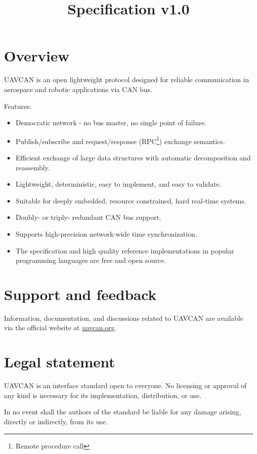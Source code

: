 \documentclass{uavcandoc}
\title{Specification v1.0}
\begin{document}
\frontmatter

\begin{titlepage}

\section*{Overview}

UAVCAN is an open lightweight protocol designed for reliable communication in aerospace and robotic applications via CAN bus.

Features:

\begin{itemize}
    \item Democratic network - no bus master, no single point of failure.
    \item Publish/subscribe and request/response (RPC\footnote{Remote procedure call}) exchange semantics.
    \item Efficient exchange of large data structures with automatic decomposition and reassembly.
    \item Lightweight, deterministic, easy to implement, and easy to validate.
    \item Suitable for deeply embedded, resource constrained, hard real-time systems.
    \item Doubly- or triply- redundant CAN bus support.
    \item Supports high-precision network-wide time synchronization.
    \item The specification and high quality reference implementations in popular programming languages are free and
    open source.
\end{itemize}

\BeginRightColumn

\section*{Support and feedback}

Information, documentation, and discussions related to UAVCAN are available via the official website at
\href{http://uavcan.org}{uavcan.org}.

\section*{Legal statement}

UAVCAN is an interface standard open to everyone.
No licensing or approval of any kind is necessary for its implementation, distribution, or use.

In no event shall the authors of the standard be liable for any damage arising, directly or indirectly, from its use.

\end{titlepage}

\tableofcontents
\clearpage
\listoffigures
\BeginRightColumn
\listoftables

\mainmatter



\end{document}
